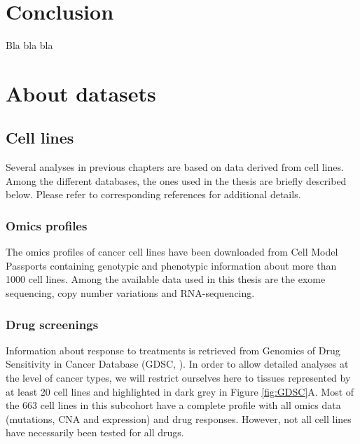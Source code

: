 \documentclass[a4paper,12pt,twoside,onecolumn,openright,final,oldfontcommands]{memoir}
\begin{document}
\chapter*{Conclusion}\label{conclusion}

Bla bla bla

\appendix {}


\chapter{About datasets}\label{appendix-datasets}

\section{Cell lines}\label{appendix-cl}

Several analyses in previous chapters are based on data derived from
cell lines. Among the different databases, the ones used in the thesis
are briefly described below. Please refer to corresponding references
for additional details.

\subsection{Omics profiles}\label{omics-profiles}

The omics profiles of cancer cell lines have been downloaded from Cell
Model Passports \citep{van2019cell} containing genotypic and phenotypic
information about more than 1000 cell lines. Among the available data
used in this thesis are the exome sequencing, copy number variations and
RNA-sequencing.

\subsection{Drug screenings}\label{appendix-GDSC}

Information about response to treatments is retrieved from Genomics of
Drug Sensitivity in Cancer Database (GDSC, \citet{yang2012genomics}). In
order to allow detailed analyses at the level of cancer types, we will
restrict ourselves here to tissues represented by at least 20 cell lines
and highlighted in dark grey in Figure \ref{fig:GDSC}A. Most of the 663
cell lines in this subcohort have a complete profile with all omics data
(mutations, CNA and expression) and drug responses. However, not all
cell lines have necessarily been tested for all drugs.
\end{document}
